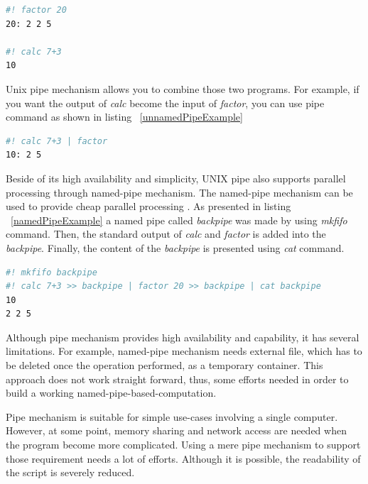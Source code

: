 \documentclass[conference]{IEEEtran}
\begin{document}
\begin{lstlisting}[caption=Usage of factor and calc, label=factorAndCalc, language=bash, basicstyle=\small, breaklines=true]
#! factor 20
20: 2 2 5

#! calc 7+3 
10
\end{lstlisting}

Unix pipe mechanism allows you to combine those two programs. For example, if you
want the output of {\it calc} become the input of {\it factor}, you can use pipe
command as shown in listing ~\ref{unnamedPipeExample}

\begin{lstlisting}[caption=Unnamed pipe example, label=unnamedPipeExample, language=bash, basicstyle=\small, breaklines=true]
#! calc 7+3 | factor
10: 2 5
\end{lstlisting}

Beside of its high availability and simplicity, UNIX pipe also supports parallel
processing through named-pipe mechanism. The named-pipe mechanism can be used to 
provide cheap parallel processing \cite{conway2003parallel}. As presented in 
listing ~\ref{namedPipeExample} a named pipe called {\it backpipe} was made by using {\it mkfifo} command. 
Then, the standard output of {\it calc} and {\it factor} is added into the {\it backpipe}. Finally, the content of the {\it backpipe} is presented using {\it cat} command.

\begin{lstlisting}[caption=Named pipe example, label=namedPipeExample, language=bash, basicstyle=\small, breaklines=true]
#! mkfifo backpipe 
#! calc 7+3 >> backpipe | factor 20 >> backpipe | cat backpipe
10
2 2 5
\end{lstlisting}

Although pipe mechanism provides high availability and capability, 
it has several limitations. For example, named-pipe mechanism needs external file, which has to be deleted once the operation performed, as a temporary container. This approach does not work straight forward, thus, some efforts needed in order to 
build a working named-pipe-based-computation. 

Pipe mechanism is suitable for simple use-cases involving a single computer. 
However, at some point, memory sharing  and network access are needed when the program become more complicated. 
Using a mere pipe mechanism to support those requirement needs a lot of 
efforts. Although it is possible, the readability of the script is severely reduced.
\end{document}
